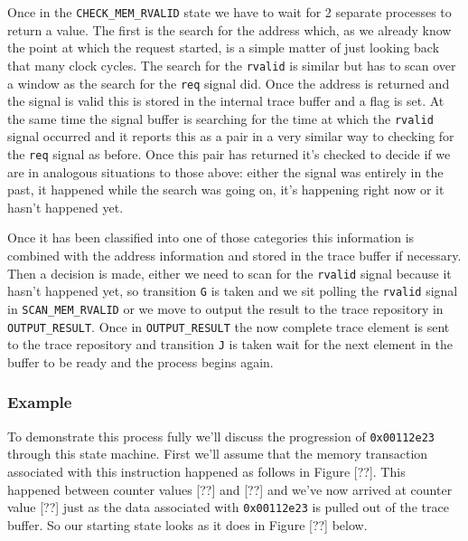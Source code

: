 Once in the \texttt{CHECK\_MEM\_RVALID} state we have to wait for 2 separate processes to return a value. The first is the search for the address which, as we already know the point at which the request started, is a simple matter of just looking back that many clock cycles. The search for the \texttt{rvalid} is similar but has to scan over a window as the search for the \texttt{req} signal did. Once the address is returned and the signal is valid this is stored in the internal trace buffer and a flag is set. At the same time the signal buffer is searching for the time at which the \texttt{rvalid} signal occurred and it reports this as a pair in a very similar way to checking for the \texttt{req} signal as before. Once this pair has returned it's checked to decide if we are in analogous situations to those above: either the signal was entirely in the past, it happened while the search was going on, it's happening right now or it hasn't happened yet. 

Once it has been classified into one of those categories this information is combined with the address information and stored in the trace buffer if necessary. Then a decision is made, either we need to scan for the \texttt{rvalid} signal because it hasn't happened yet, so transition \texttt{G} is taken and we sit polling the \texttt{rvalid} signal in \texttt{SCAN\_MEM\_RVALID} or we move to output the result to the trace repository in \texttt{OUTPUT\_RESULT}. Once in \texttt{OUTPUT\_RESULT} the now complete trace element is sent to the trace repository and transition \texttt{J} is taken wait for the next element in the buffer to be ready and the process begins again.

\subsubsection{Example}

To demonstrate this process fully we'll discuss the progression of \texttt{0x00112e23} through this state machine. First we'll assume that the memory transaction associated with this instruction happened as follows in Figure [??]. This happened between counter values [??] and [??] and we've now arrived at counter value [??] just as the data associated with \texttt{0x00112e23} is pulled out of the trace buffer. So our starting state looks as it does in Figure [??] below.



